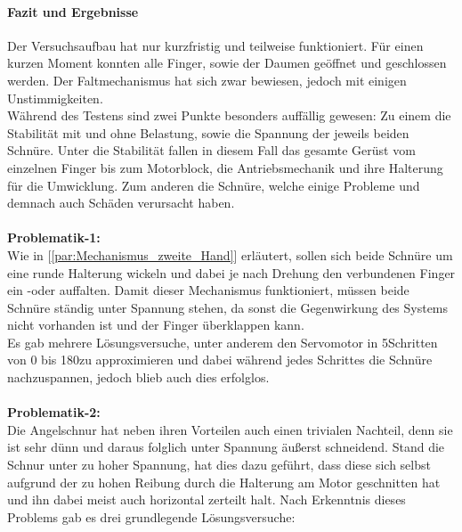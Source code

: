 \documentclass[titlepage,12pt,twoside]{article}
\begin{document}
\paragraph{Fazit und Ergebnisse}
\hfill \break
\hfill \break
Der Versuchsaufbau hat nur kurzfristig und teilweise funktioniert. Für einen kurzen Moment konnten alle Finger, sowie der Daumen geöffnet und geschlossen werden. Der Faltmechanismus hat sich zwar bewiesen, jedoch mit einigen Unstimmigkeiten. \\
Während des Testens sind zwei Punkte besonders auffällig gewesen: Zu einem die Stabilität mit und ohne Belastung, sowie die Spannung der jeweils beiden Schnüre. Unter die Stabilität fallen in diesem Fall das gesamte Gerüst vom einzelnen Finger 
bis zum Motorblock, die Antriebsmechanik und ihre Halterung für die Umwicklung. Zum anderen die Schnüre, welche einige Probleme und demnach auch Schäden verursacht haben. \\
\\
\textbf{Problematik-1: } \\
Wie in [\textcolor{blue}{\autoref{par:Mechanismus_zweite_Hand}}] erläutert, sollen sich beide Schnüre um eine runde Halterung wickeln und dabei je nach Drehung den verbundenen Finger ein -oder auffalten. Damit dieser Mechanismus funktioniert, müssen beide Schnüre 
ständig unter Spannung stehen, da sonst die Gegenwirkung des Systems nicht vorhanden ist und der Finger überklappen kann. \\
Es gab mehrere Lösungsversuche, unter anderem den Servomotor in 5\textdegree Schritten von 0 bis 180\textdegree zu approximieren und dabei während jedes Schrittes die Schnüre nachzuspannen, jedoch blieb auch dies erfolglos. \\
\\
\textbf{Problematik-2: } \\
Die Angelschnur hat neben ihren Vorteilen auch einen trivialen Nachteil, denn sie ist sehr dünn und daraus folglich unter Spannung äußerst schneidend. Stand die Schnur unter zu hoher Spannung, hat dies dazu geführt, dass diese sich 
selbst aufgrund der zu hohen Reibung durch die Halterung am Motor geschnitten hat und ihn dabei meist auch horizontal zerteilt halt. Nach Erkenntnis dieses Problems gab es drei grundlegende Lösungsversuche:
\end{document}

